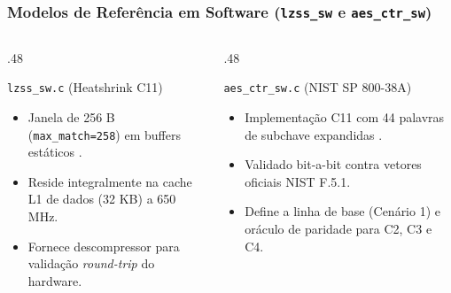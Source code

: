 \begin{frame}
  \frametitle{Modelos de Refer\^encia em Software (\texttt{lzss\_sw} e \texttt{aes\_ctr\_sw})}
  \begin{columns}[T]
    \begin{column}{.48\textwidth}
      \begin{block}{\texttt{lzss\_sw.c} (Heatshrink C11)}
        \begin{itemize}
          \item Janela de 256 B (\texttt{max\_match=258}) em buffers est\'aticos \autocite{Heatshrink}.
          \item Reside integralmente na cache L1 de dados (32 KB) a 650 MHz.
          \item Fornece descompressor para valida\c{c}\~ao \textit{round-trip} do hardware.
        \end{itemize}
      \end{block}
    \end{column}
    \begin{column}{.48\textwidth}
      \begin{block}{\texttt{aes\_ctr\_sw.c} (NIST SP 800-38A)}
        \begin{itemize}
          \item Implementa\c{c}\~ao C11 com 44 palavras de subchave expandidas \autocite{NISTFIPS197,NISTSP80038A}.
          \item Validado bit-a-bit contra vetores oficiais NIST F.5.1.
          \item Define a linha de base (Cen\'ario 1) e or\'aculo de paridade para C2, C3 e C4.
        \end{itemize}
      \end{block}
    \end{column}
  \end{columns}
\end{frame}
